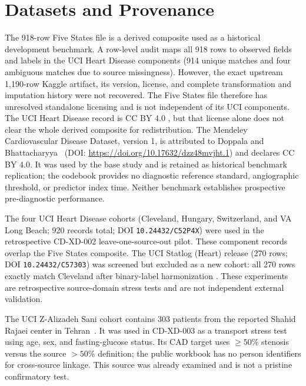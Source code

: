 \documentclass[journal]{IEEEtran}
\begin{document}
\section{Datasets and Provenance}
The 918-row Five States file is a derived composite used as a historical
development benchmark. A row-level audit maps all 918 rows to observed fields
and labels in the UCI Heart Disease components (914 unique matches and four
ambiguous matches due to source missingness). However, the exact upstream
1,190-row Kaggle artifact, its version, license, and complete transformation
and imputation history were not recovered. The Five States file therefore has
unresolved standalone licensing and is not independent of its UCI components.
The UCI Heart Disease record is CC BY 4.0 \cite{ucihd}, but that license alone
does not clear the whole derived composite for redistribution. The Mendeley
Cardiovascular Disease Dataset, version 1, is attributed to Doppala and
Bhattacharyya~\cite{doppala2021dataset} (DOI:
\url{https://doi.org/10.17632/dzz48mvjht.1}) and declares CC BY 4.0. It was
used by the base study and is retained as historical benchmark replication;
the codebook provides no diagnostic reference standard, angiographic
threshold, or predictor index time. Neither benchmark establishes prospective
pre-diagnostic performance.

The four UCI Heart Disease cohorts (Cleveland, Hungary, Switzerland, and VA
Long Beach; 920 records total; DOI \texttt{10.24432/C52P4X}) were used in the
retrospective CD-XD-002 leave-one-source-out pilot. These component records
overlap the Five States composite. The UCI Statlog (Heart) release (270 rows;
DOI \texttt{10.24432/C57303}) was screened but excluded as a new cohort: all
270 rows exactly match Cleveland after binary-label harmonization
\cite{ucistatlog}. These experiments
are retrospective source-domain stress tests and are not independent external
validation.

The UCI Z-Alizadeh Sani cohort contains 303 patients from the reported Shahid
Rajaei center in Tehran~\cite{alizadehsani2013cad,uciz}. It was used in
CD-XD-003 as a transport stress test using age, sex, and fasting-glucose
status. Its CAD target uses \(\geq50\%\) stenosis versus the source
\(>50\%\) definition; the public workbook has no person identifiers for
cross-source linkage. This source was already examined and is not a pristine
confirmatory test.
\end{document}
